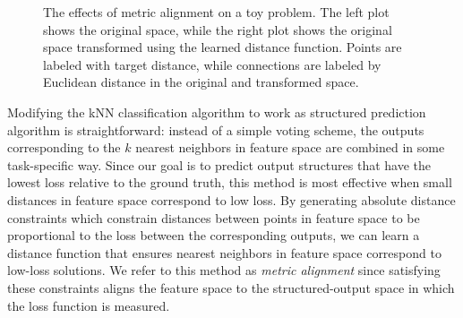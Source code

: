 \begin{figure}[t]
\begin{center}
\caption{The effects of metric alignment on a toy problem. The left plot shows the original space, while the right plot shows the original space transformed using the learned distance function. Points are labeled with target distance, while connections are labeled by Euclidean distance in the original and transformed space.}
\label{fig:approach_overview}
\end{center}
\end{figure}

Modifying the \ac{kNN} classification algorithm to work as structured prediction algorithm is straightforward: instead of a simple voting scheme, the outputs corresponding to the $k$ nearest neighbors in feature space are combined in some task-specific way. Since our goal is to predict output structures that have the lowest loss relative to the ground truth, this method is most effective when small distances in feature space correspond to low loss. By generating absolute distance constraints which constrain distances between points in feature space to be proportional to the loss between the corresponding outputs, we can learn a distance function that ensures nearest neighbors in feature space correspond to low-loss solutions. We refer to this method as \emph{metric alignment} since satisfying these constraints aligns the feature space to the structured-output space in which the loss function is measured.

